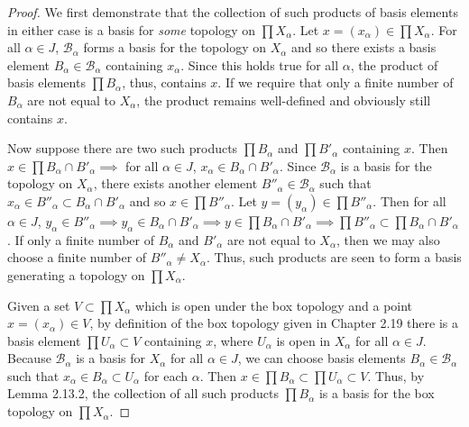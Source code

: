 \begin{solution}
    \begin{proof}
        We first demonstrate that the collection of such products of basis elements in either case is a basis for \textit{some} topology on $\prod X_\alpha$.
        Let $x = (x_\alpha) \in \prod X_\alpha$.
        For all $\alpha \in J$, $\mathscr{B}_\alpha$ forms a basis for the topology on $X_\alpha$ and so there exists a basis element $B_\alpha \in \mathscr{B}_\alpha$ containing $x_\alpha$.
        Since this holds true for all $\alpha$, the product of basis elements $\prod B_\alpha$, thus, contains $x$.
        If we require that only a finite number of $B_\alpha$ are not equal to $X_\alpha$, the product remains well-defined and obviously still contains $x$.

        Now suppose there are two such products $\prod B_\alpha$ and $\prod B'_\alpha$ containing $x$.
        Then $x \in \prod B_\alpha \cap B'_\alpha \implies$ for all $\alpha \in J$, $x_\alpha \in B_\alpha \cap B'_\alpha$.
        Since $\mathscr{B}_\alpha$ is a basis for the topology on $X_\alpha$, there exists another element $B''_\alpha \in \mathscr{B}_\alpha$ such that $x_\alpha \in B''_\alpha \subset B_\alpha \cap B'_\alpha$ and so $x \in \prod B''_\alpha$.
        Let $y = (y_\alpha) \in \prod B''_\alpha$.
        Then for all $\alpha \in J$, $y_\alpha \in B''_\alpha \implies y_\alpha \in B_\alpha \cap B'_\alpha \implies y \in \prod B_\alpha \cap B'_\alpha \implies \prod B''_\alpha \subset \prod B_\alpha \cap B'_\alpha$.
        If only a finite number of $B_\alpha$ and $B'_\alpha$ are not equal to $X_\alpha$, then we may also choose a finite number of $B''_\alpha \neq X_\alpha$.
        Thus, such products are seen to form a basis generating a topology on $\prod X_\alpha$.

        Given a set $V \subset \prod X_\alpha$ which is open under the box topology and a point $x = (x_\alpha) \in V$, by definition of the box topology given in Chapter 2.19 there is a basis element $\prod U_\alpha \subset V$ containing $x$, where $U_\alpha$ is open in $X_\alpha$ for all $\alpha \in J$.
        Because $\mathscr{B}_\alpha$ is a basis for $X_\alpha$ for all $\alpha \in J$, we can choose basis elements $B_\alpha \in \mathscr{B}_\alpha$ such that $x_\alpha \in B_\alpha \subset U_\alpha$ for each $\alpha$.
        Then $x \in \prod B_\alpha \subset \prod U_\alpha \subset V$.
        Thus, by Lemma 2.13.2, the collection of all such products $\prod B_\alpha$ is a basis for the box topology on $\prod X_\alpha$.


\end{proof}
\end{solution}
